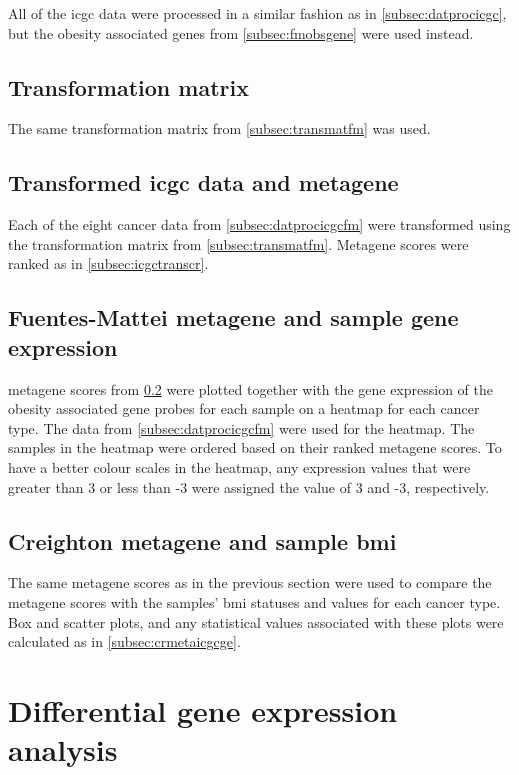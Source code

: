 All of the \gls{icgc} data were processed in a similar fashion as in \cref{subsec:datprocicgc}, but the obesity associated genes from \cref{subsec:fmobsgene} were used instead.

\subsection{Transformation matrix}
\label{subsec:icgctransmatfm}

The same transformation matrix from \cref{subsec:transmatfm} was used.

\subsection{Transformed \gls{icgc} data and metagene}
\label{subsec:icgctransfm}

Each of the eight cancer data from \cref{subsec:datprocicgcfm} were transformed using the transformation matrix from \cref{subsec:transmatfm}.
Metagene scores were ranked as in \cref{subsec:icgctranscr}.

\subsection{Fuentes-Mattei metagene and sample gene expression}
\label{subsec:fmmetaicgcge}

\Gls{metagene} scores from \cref{subsec:icgctransfm} were plotted together with the gene expression of the obesity associated gene probes for each sample on a heatmap for each cancer type.
The data from \cref{subsec:datprocicgcfm} were used for the heatmap.
The samples in the heatmap were ordered based on their ranked \gls{metagene} scores.
To have a better colour scales in the heatmap, any expression values that were greater than 3 or less than -3 were assigned the value of 3 and -3, respectively.

\subsection{Creighton metagene and sample \gls{bmi}}
\label{subsec:fmmetaicgcge}

The same \gls{metagene} scores as in the previous section were used to compare the \gls{metagene} scores with the samples' \gls{bmi} statuses and values for each cancer type.
Box and scatter plots, and any statistical values associated with these plots were calculated as in \cref{subsec:crmetaicgcge}.

\section{Differential gene expression analysis}
\label{sec:deg}

